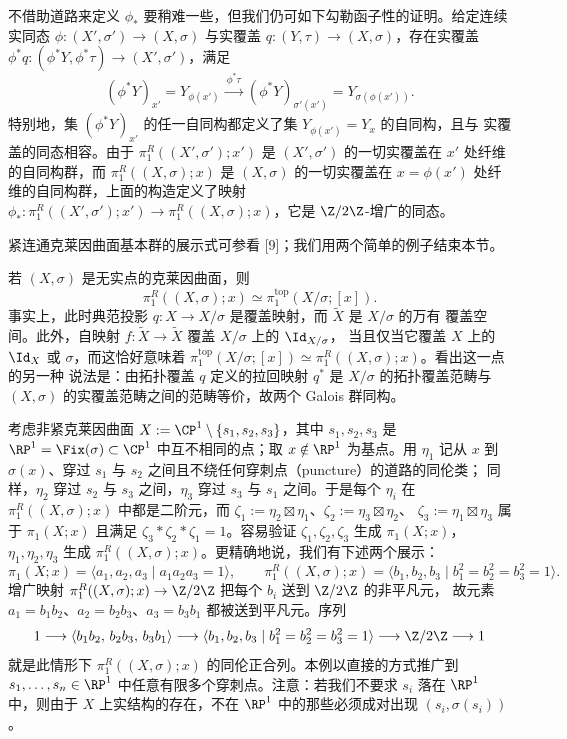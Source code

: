 不借助道路来定义 $\phi_*$ 要稍难一些，但我们仍可如下勾勒函子性的证明。给定连续实同态
$\phi:(X',\sigma')\to(X,\sigma)$ 与实覆盖 $q:(Y,\tau)\to(X,\sigma)$，存在实覆盖
$\phi^*q:(\phi^*Y,\phi^*\tau)\to(X',\sigma')$，满足
\[
(\phi^*Y)_{x'}=Y_{\phi(x')}\xrightarrow{\ \phi^*\tau\ }(\phi^*Y)_{\sigma'(x')}
=Y_{\sigma(\phi(x'))}.
\]
特别地，集 $(\phi^*Y)_{x'}$ 的任一自同构都定义了集 $Y_{\phi(x')}=Y_x$ 的自同构，且与
实覆盖的同态相容。由于 $\pi^R_1((X',\sigma');x')$ 是 $(X',\sigma')$ 的一切实覆盖在
$x'$ 处纤维的自同构群，而 $\pi^R_1((X,\sigma);x)$ 是 $(X,\sigma)$ 的一切实覆盖在
$x=\phi(x')$ 处纤维的自同构群，上面的构造定义了映射
$\phi_*:\pi^R_1((X',\sigma');x')\to\pi^R_1((X,\sigma);x)$，它是 $\Z/2\Z$-增广的同态。

紧连通克莱因曲面基本群的展示式可参看 [9]；我们用两个简单的例子结束本节。

\begin{example}\label{ex:2.2.19}
若 $(X,\sigma)$ 是无实点的克莱因曲面，则
\[
\pi^R_1((X,\sigma);x)\simeq\pi_1^{\mathrm{top}}(X/\sigma;[x]).
\]
事实上，此时典范投影 $q:X\to X/\sigma$ 是覆盖映射，而 $\tilde X$ 是 $X/\sigma$ 的万有
覆盖空间。此外，自映射 $f:\tilde X\to\tilde X$ 覆盖 $X/\sigma$ 上的 $\Id_{X/\sigma}$，
当且仅当它覆盖 $X$ 上的 $\Id_X$ 或 $\sigma$，而这恰好意味着
$\pi_1^{\mathrm{top}}(X/\sigma;[x])\simeq\pi^R_1((X,\sigma);x)$。看出这一点的另一种
说法是：由拓扑覆盖 $q$ 定义的拉回映射 $q^*$ 是 $X/\sigma$ 的拓扑覆盖范畴与 $(X,\sigma)$
的实覆盖范畴之间的范畴等价，故两个 Galois 群同构。
\end{example}

\begin{example}\label{ex:2.2.20}
考虑非紧克莱因曲面
$X:=\CP^1\setminus\{s_1,s_2,s_3\}$，其中 $s_1,s_2,s_3$ 是
$\RP^1=\Fix(\sigma)\subset\CP^1$ 中互不相同的点；取 $x\notin\RP^1$ 为基点。用 $\eta_1$
记从 $x$ 到 $\sigma(x)$、穿过 $s_1$ 与 $s_2$ 之间且不绕任何穿刺点（puncture）的道路的同伦类；
同样，$\eta_2$ 穿过 $s_2$ 与 $s_3$ 之间，$\eta_3$ 穿过 $s_3$ 与 $s_1$ 之间。于是每个
$\eta_i$ 在 $\pi^R_1((X,\sigma);x)$ 中都是二阶元，而
$\zeta_1:=\eta_2\boxtimes\eta_1$、$\zeta_2:=\eta_3\boxtimes\eta_2$、
$\zeta_3:=\eta_1\boxtimes\eta_3$ 属于 $\pi_1(X;x)$ 且满足
$\zeta_3*\zeta_2*\zeta_1=1$。容易验证 $\zeta_1,\zeta_2,\zeta_3$ 生成 $\pi_1(X;x)$，
$\eta_1,\eta_2,\eta_3$ 生成 $\pi^R_1((X,\sigma);x)$。更精确地说，我们有下述两个展示：
\[
\pi_1(X;x)=\langle a_1,a_2,a_3\mid a_1a_2a_3=1\rangle,
\qquad
\pi^R_1((X,\sigma);x)=\langle b_1,b_2,b_3\mid b_1^2=b_2^2=b_3^2=1\rangle.
\]
增广映射 $\pi^R_1((X,\sigma);x)\to\Z/2\Z$ 把每个 $b_i$ 送到 $\Z/2\Z$ 的非平凡元，
故元素 $a_1=b_1b_2$、$a_2=b_2b_3$、$a_3=b_3b_1$ 都被送到平凡元。序列
\[
1\longrightarrow\langle b_1b_2,\,b_2b_3,\,b_3b_1\rangle
\longrightarrow\langle b_1,b_2,b_3\mid b_1^2=b_2^2=b_3^2=1\rangle
\longrightarrow\Z/2\Z\longrightarrow1
\]
就是此情形下 $\pi^R_1((X,\sigma);x)$ 的同伦正合列。本例以直接的方式推广到
$s_1,\dots,s_n\in\RP^1$ 中任意有限多个穿刺点。注意：若我们不要求 $s_i$ 落在
$\RP^1$ 中，则由于 $X$ 上实结构的存在，不在 $\RP^1$ 中的那些必须成对出现
$(s_i,\sigma(s_i))$。
\end{example}
